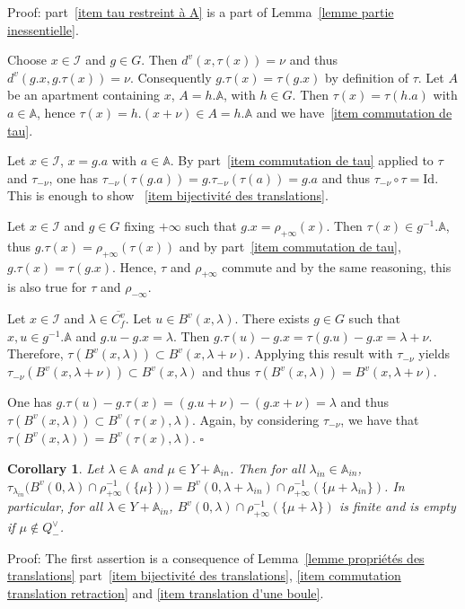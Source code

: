 \documentclass[12pt]{article}
\theoremstyle{plain}
\newtheorem{cor}[thm]{Corollary}
\theoremstyle{definition}
\newcommand{\A}{\mathbb{A}}
\newcommand{\I}{\mathcal{I}}
\newcommand{\Id}{\mathrm{Id}}
\begin{document}
Proof: part~\ref{item tau restreint à A} is a part of Lemma~\ref{lemme partie inessentielle}.


Choose $x\in \I$ and $g\in G$. Then $d^v(x,\tau(x))=\nu$ and thus $d^v(g.x,g.\tau(x))=\nu$. Consequently $g.\tau(x)=\tau(g.x)$ by definition of $\tau$. Let $A$ be an apartment containing $x$, $A=h.\A$, with $h\in G$. Then $\tau(x)=\tau(h.a)$ with $a\in \A$, hence $\tau(x)=h.(x+\nu)\in A=h.\A$ and we have~\ref{item commutation de tau}.

Let $x\in\I$, $x=g.a$ with $a\in \A$. By part~\ref{item commutation de tau} applied to $\tau$ and $\tau_{-\nu}$, one has $\tau_{-\nu}(\tau(g.a))=g.\tau_{-\nu}(\tau(a))=g.a$ and thus $\tau_{-\nu}\circ\tau=\Id$. This is enough to show ~\ref{item bijectivité des translations}.

Let $x\in \I$ and $g\in G$ fixing $+\infty$ such that $g.x=\rho_{+\infty}(x)$. 
Then $\tau(x)\in g^{-1}.\A$, thus $g.\tau(x)=\rho_{+\infty}(\tau(x))$ and by
 part~\ref{item commutation de tau}, $g.\tau(x)=\tau(g.x)$. Hence, $\tau$ and
  $\rho_{+\infty}$ commute and by the same reasoning, this is also true for $\tau$ and $\rho_{-\infty}$.

Let $x\in\I$ and $\lambda\in \overline{C_f^v}$. Let $u\in B^v(x,\lambda)$. There exists $g\in G$ such that $x,u\in g^{-1}.\A$ and $g.u-g.x=\lambda$. Then $g.\tau(u)-g.x=\tau(g.u)-g.x=\lambda+\nu$. Therefore, $\tau(B^v(x,\lambda))\subset B^v(x,\lambda+\nu)$. Applying this result with $\tau_{-\nu}$ yields $\tau_{-\nu}(B^v(x,\lambda+\nu))\subset B^v(x,\lambda)$ and thus $\tau(B^v(x,\lambda))=B^v(x,\lambda+\nu)$.

One has $g.\tau(u)-g.\tau(x)=(g.u+\nu)-(g.x+\nu)=\lambda$ and thus $\tau(B^v(x,\lambda))\subset B^v(\tau(x),\lambda)$. Again, by considering $\tau_{-\nu}$, we have that $\tau(B^v(x,\lambda))=B^v(\tau(x),\lambda)$. $\square$


 
 
\begin{cor}\label{cor finitude des boules}
Let $\lambda\in \A$ and $\mu\in Y+\A_{in}$. Then for all $\lambda_{in}\in \A_{in}$, $\tau_{\lambda_{in}}\big(B^v(0,\lambda)\cap \rho_{+\infty}^{-1}(\{\mu\})\big)=B^v(0,\lambda+\lambda_{in})\cap \rho_{+\infty}^{-1}(\{\mu+\lambda_{in}\})$. In particular, for all $\lambda\in Y+\A_{in}$, $B^v(0,\lambda)\cap \rho_{+\infty}^{-1}(\{\mu+\lambda\})$ is finite and is empty if $\mu\notin Q^\vee_-$.

\end{cor}

Proof: The first assertion is a consequence of Lemma~\ref{lemme propriétés des translations} part~\ref{item bijectivité des translations}, \ref{item commutation translation retraction} and \ref{item translation d'une boule}.
\end{document}
